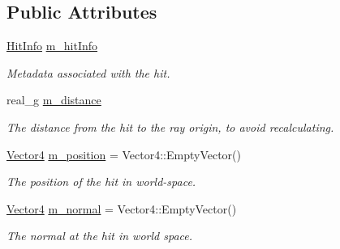 \subsection*{Public Attributes}
\begin{DoxyCompactItemize}
\item 
\mbox{\label{structrev_1_1_world_ray_hit_a7bc0eb122dc559b92fb565feb4ff6122}} 
\mbox{\hyperlink{structrev_1_1_hit_info}{Hit\+Info}} \mbox{\hyperlink{structrev_1_1_world_ray_hit_a7bc0eb122dc559b92fb565feb4ff6122}{m\+\_\+hit\+Info}}
\begin{DoxyCompactList}\small\item\em Metadata associated with the hit. \end{DoxyCompactList}\item 
\mbox{\label{structrev_1_1_world_ray_hit_a8cda892fce06399de4455b88ba154f87}} 
real\+\_\+g \mbox{\hyperlink{structrev_1_1_world_ray_hit_a8cda892fce06399de4455b88ba154f87}{m\+\_\+distance}}
\begin{DoxyCompactList}\small\item\em The distance from the hit to the ray origin, to avoid recalculating. \end{DoxyCompactList}\item 
\mbox{\label{structrev_1_1_world_ray_hit_ad12c41d52c440b428485997d242bef6f}} 
\mbox{\hyperlink{classrev_1_1_vector}{Vector4}} \mbox{\hyperlink{structrev_1_1_world_ray_hit_ad12c41d52c440b428485997d242bef6f}{m\+\_\+position}} = Vector4\+::\+Empty\+Vector()
\begin{DoxyCompactList}\small\item\em The position of the hit in world-\/space. \end{DoxyCompactList}\item 
\mbox{\label{structrev_1_1_world_ray_hit_ab6dc625f6d1b998090763c3548a802b3}} 
\mbox{\hyperlink{classrev_1_1_vector}{Vector4}} \mbox{\hyperlink{structrev_1_1_world_ray_hit_ab6dc625f6d1b998090763c3548a802b3}{m\+\_\+normal}} = Vector4\+::\+Empty\+Vector()
\begin{DoxyCompactList}\small\item\em The normal at the hit in world space. \end{DoxyCompactList}\end{DoxyCompactItemize}


